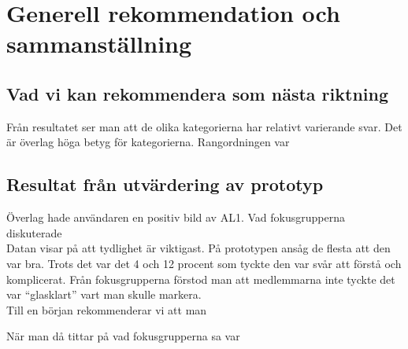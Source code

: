 \section{Generell rekommendation och sammanställning}

\subsection{Vad vi kan rekommendera som nästa riktning}
Från resultatet ser man att de olika kategorierna har relativt varierande svar. Det är överlag höga betyg för kategorierna. Rangordningen var

\subsection{Resultat från utvärdering av prototyp}
Överlag hade användaren en positiv bild av AL1. Vad fokusgrupperna diskuterade
\\

Datan visar på att tydlighet är viktigast. På prototypen ansåg de flesta att den var bra. Trots det var det 4 och 12 procent som tyckte den var svår att förstå och komplicerat. 
Från fokusgrupperna förstod man att medlemmarna inte tyckte det var \enquote{glasklart} vart man skulle markera. 
\\
Till en början rekommenderar vi att man 

När man då tittar på vad fokusgrupperna sa var